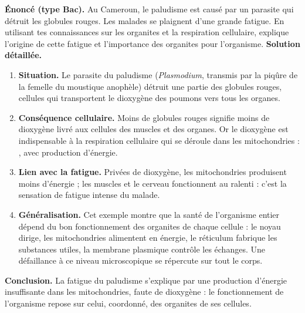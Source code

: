 \documentclass[11pt]{article}
\newcommand{\cle}[1]{{\popxbold\color{popdark}#1}}
\begin{document}
\begin{exoresolu}
\textbf{Énoncé (type Bac).} Au Cameroun, le paludisme est causé par un parasite qui détruit les globules rouges. Les malades se plaignent d'une grande fatigue. En utilisant tes connaissances sur les organites et la respiration cellulaire, explique l'origine de cette fatigue et l'importance des organites pour l'organisme.
\tcblower
\textbf{Solution détaillée.}
\begin{enumerate}
\item \textbf{Situation.} Le parasite du paludisme (\emph{Plasmodium}, transmis par la piqûre de la femelle du moustique anophèle) détruit une partie des globules rouges, cellules qui transportent le dioxygène des poumons vers tous les organes.
\item \textbf{Conséquence cellulaire.} Moins de globules rouges signifie moins de dioxygène livré aux cellules des muscles et des organes. Or le dioxygène est indispensable à la \cle{respiration cellulaire} qui se déroule dans les \cle{mitochondries} : , avec production d'énergie.
\item \textbf{Lien avec la fatigue.} Privées de dioxygène, les mitochondries produisent moins d'énergie ; les muscles et le cerveau fonctionnent au ralenti : c'est la sensation de fatigue intense du malade.
\item \textbf{Généralisation.} Cet exemple montre que la santé de l'organisme entier dépend du bon fonctionnement des organites de chaque cellule : le noyau dirige, les mitochondries alimentent en énergie, le réticulum fabrique les substances utiles, la membrane plasmique contrôle les échanges. Une défaillance à ce niveau microscopique se répercute sur tout le corps.
\end{enumerate}
\textbf{Conclusion.} La fatigue du paludisme s'explique par une production d'énergie insuffisante dans les mitochondries, faute de dioxygène : le fonctionnement de l'organisme repose sur celui, coordonné, des organites de ses cellules.
\end{exoresolu}
\end{document}
